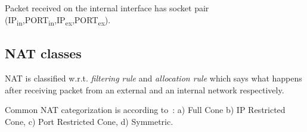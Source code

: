 \documentclass[twoside]{article}
\begin{document}
\begin{multicols}{2}
Packet received on the internal interface has socket pair {(IP\textsubscript{in},PORT\textsubscript{in},IP\textsubscript{ex},PORT\textsubscript{ex})}.

% 
% 

\subsection{NAT classes}\label{sec:nat}
NAT is classified w.r.t. \emph{filtering rule} and \emph{allocation rule} which says what happens after receiving
packet from an external and an internal network respectively.

Common NAT categorization is according to~\citep{rfc3489}: a) Full Cone
b) IP Restricted Cone, c) Port Restricted Cone, d) Symmetric.


\end{multicols}
\end{document}
